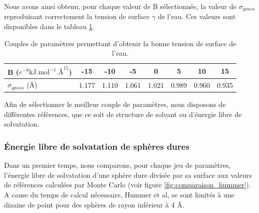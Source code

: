 Nous avons ainsi obtenu, pour chaque valeur de B sélectionnée, la valeur de $\sigma_{gauss}$ reproduisant correctement la tension de surface $\gamma$ de l'eau. Ces valeurs sont disponibles dans le tableau \ref{tab:parametres_bridge}.

\begin{table}[ht]
 \centering
  \begin{tabular}{l || c c c c c c c}
    \hline
    B ($e^{-8} \mathrm{kJ.mol}^{-1}.\text{\AA}^{15}$)  & -15 & -10 & -5 & 0 & 5 & 10 & 15  \\
    \hline
     $\sigma_{gauss}$ (\AA)  & 1.177 & 1.110 & 1.061 & 1.021 & 0.989 & 0.960 & 0.935  \\
    \hline
  \end{tabular}
  \caption{Couples de paramètres permettant d'obtenir la bonne tension de surface de l'eau.}
  \label{tab:parametres_bridge}  
\end{table}

Afin de sélectionner le meilleur couple de paramètres, nous disposons de différentes références, que ce soit de structure de solvant ou d'énergie libre de solvatation. 


\subsubsection{\'Energie libre de solvatation de sphères dures}
Dans un premier temps, nous comparons, pour chaque jeu de paramètres, l'\'energie libre de solvatation d'une sphère dure divisée par sa surface aux valeurs de références calculées par Monte Carlo\cite{hummer_information_1996} (voir figure \ref{fig:comparaison_hummer}). A cause du temps de calcul nécessaire, Hummer et al\cite{hummer_information_1996}, se sont limités à une dizaine de point pour des sphères de rayon inférieur à 4 \AA.




